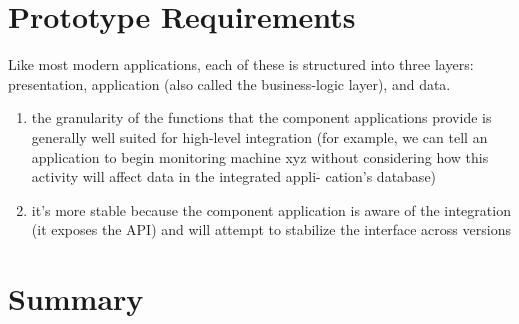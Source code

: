 \section{Prototype Requirements}
Like most modern applications, each of these is structured into three layers: presentation, 
application (also called the business-logic layer), and data.
\begin{enumerate}
\item the granularity of the functions that the component applications provide is generally well
suited for high-level integration (for example, we can tell an application to begin monitoring
machine xyz without considering how this activity will affect data in the integrated appli-
cation’s database)
\item it’s more stable because the component application is aware of the integration (it exposes
the API) and will attempt to stabilize the interface across versions
\end{enumerate}

\section{Summary}

